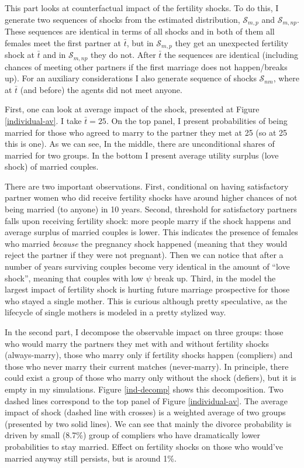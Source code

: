 \documentclass[12pt,letter]{article}
\begin{document}
This part looks at counterfactual impact of the fertility shocks. To do this, I generate two sequences of shocks from the estimated distribution, $\mathcal{S}_{m,p}$ and $\mathcal{S}_{m,np}$. These sequences are identical in terms of all shocks and in both of them all females meet the first partner at $\bar{t}$, but in $\mathcal{S}_{m,p}$ they get an unexpected fertility shock at $\bar{t}$ and in $\mathcal{S}_{m,np}$ they do not. After $\bar{t}$ the sequences are identical (including chances of meeting other partners if the first marriage does not happen/breaks up).  For an auxiliary considerations I also generate sequence of shocks $\mathcal{S}_{nm}$, where at $\bar{t}$ (and before) the agents did not meet anyone. 

First, one can look at average impact of the shock, presented at Figure \ref{individual-av}. I take $\bar{t} = 25$. On the top panel, I present probabilities of being married for those who agreed to marry to the partner they met at 25 (so at 25 this is one). As we can see, In the middle, there are unconditional shares of married for two groups. In the bottom I present average utility surplus (love shock) of married couples.

There are two important observations. First, conditional on having satisfactory partner women who did receive fertility shocks have around higher chances of not being married (to anyone) in 10 years. Second, threshold for satisfactory partners falls upon receiving fertility shock: more people marry if the shock happens and average surplus of married couples is lower. This indicates the presence of females who married \emph{because} the pregnancy shock happened (meaning that they would reject the partner if they were not pregnant). Then we can notice that after a number of years surviving couples become very identical in the amount of ``love shock'', meaning that couples with low $\psi$ break up. Third, in the model the largest impact of fertility shock is hurting future marriage prospective for those who stayed a single mother. This is curious although pretty speculative, as the lifecycle of single mothers is modeled in a pretty stylized way.

In the second part, I decompose the observable impact on three groups: those who would marry the partners they met with and without fertility shocks (always-marry), those who marry only if fertility shocks happen (compliers) and those who never marry their current matches (never-marry). In principle, there could exist a group of those who marry only without the shock (defiers), but it is empty in my simulations. Figure \ref{ind-decomp} shows this decomposition. Two dashed lines correspond to the top panel of Figure \ref{individual-av}. The average impact of shock (dashed line with crosses) is a weighted average of two groups (presented by two solid lines). We can see that mainly the divorce probability is driven by small (8.7\%) group of compliers who have dramatically lower probabilities to stay married. Effect on fertility shocks on those who would've married anyway still persists, but is around 1\%. %
\end{document}
